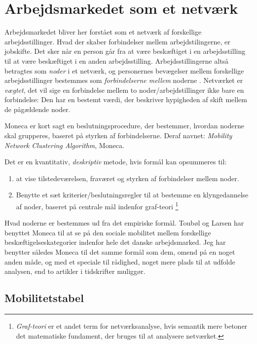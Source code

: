 \section{Arbejdsmarkedet som et netværk \label{sec_}}

Arbejdsmarkedet bliver her forstået som et netværk af forskellige arbejdsstillinger. Hvad der skaber forbindelser mellem arbejdstilingerne, er jobskifte.  Det sker når en person går fra at være beskæftiget i en arbejdsstilling til at være beskæftiget i en anden arbejdsstilling. Arbejdsstillingerne altså betragtes som \emph{noder} i et netværk, og personernes bevægelser mellem forskellige arbejdsstillinger bestemmes som \emph{forbindelserne mellem} noderne . Netværket er \emph{vægtet}, det vil sige en forbindelse mellem to noder/arbejdstillinger ikke bare en forbindelse: Den har en bestemt værdi, der beskriver hypigheden af skift mellem de pågældende noder.

Moneca er kort sagt en beslutningsprocedure, der bestemmer, hvordan noderne skal grupperes, baseret på styrken af forbindelserne. Deraf navnet: \emph{Mobility Network Clustering Algorithm}, Moneca.

Det er en kvantitativ, \emph{deskriptiv} metode, hvis formål kan opsummeres til: 
%
\begin{enumerate} \label{monecaformaal}
  \item at vise tilstedeværelsen, fraværet og styrken af forbindelser mellem noder.
  \item Benytte et sæt kriterier/beslutningsregler til at bestemme en klyngedannelse af noder, baseret på centrale mål indenfor graf-teori%
  		\footnote{ \emph{Graf-teori} er et andet term for netværksanalyse, hvis semantik mere betoner det matematiske fundament, der bruges til at analysere netværket.}%
\end{enumerate}
%

Hvad noderne er bestemmes ud fra det empiriske formål. Toubøl og Larsen har benyttet Moneca til at se på den sociale mobilitet mellem forskellige beskæftigelseskategorier indenfor hele det danske arbejdsmarked. Jeg har benytter således Moneca til det samme formål som dem, omend på en noget anden måde, og med et speciale til rådighed, noget mere plads til at udfolde analysen, end to artikler i tidskrifter muliggør. 

%
\subsection{ Mobilitetstabel \label{subsec_}}
%


